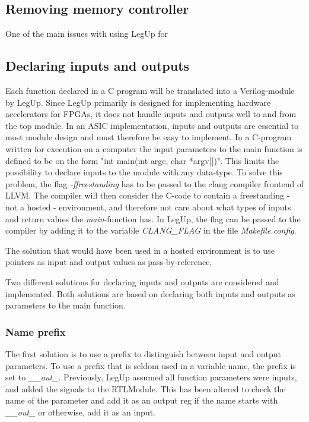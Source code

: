 



\subsection{Removing memory controller}
One of the main issues with using LegUp for 

\subsection{\label{subsec:inoutdecl}Declaring inputs and outputs}
Each function declared in a C program will be translated into a Verilog-module by LegUp. Since LegUp primarily is designed for implementing hardware accelerators for FPGAs, it does not handle inputs and outputs well to and from the top module. In an ASIC implementation, inputs and outputs are essential to most module design and must therefore be easy to implement. In a C-program written for execution on a computer the input parameters to the main function is defined to be on the form "int main(int argc, char *argv[])". This limits the possibility to declare inputs to the module with any data-type. To solve this problem, the flag \textit{-ffreestanding} has to be passed to the clang compiler frontend of LLVM. The compiler will then consider the C-code to contain a freestanding - not a hosted - environment, and therefore not care about what types of inputs and return values the \textit{main}-function has. In LegUp, the flag can be passed to the compiler by adding it to the variable \textit{CLANG\_FLAG} in the file \textit{Makefile.config}.

The solution that would have been used in a hosted environment is to use pointers as input and output values as pass-by-reference.

Two different solutions for declaring inputs and outputs are considered and implemented. Both solutions are based on declaring both inputs and outputs as parameters to the main function.
\subsubsection{Name prefix}
The first solution is to use a prefix to distinguish between input and output parameters. To use a prefix that is seldom used in a variable name, the prefix is set to \textit{\_\_out\_}. Previously, LegUp assumed all function parameters were inputs, and added the signals to the RTLModule. This has been altered to check the name of the parameter and add it as an output reg if the name starts with \textit{\_\_out\_} or otherwise, add it as an input.

